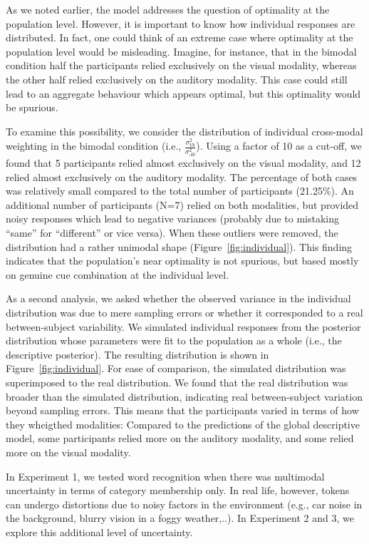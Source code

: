 \documentclass[english,man]{apa6}
\theoremstyle{definition}
\theoremstyle{definition}
\theoremstyle{definition}
\theoremstyle{remark}
\begin{document}
As we noted earlier, the model addresses the question of optimality at
the population level. However, it is important to know how individual
responses are distributed. In fact, one could think of an extreme case
where optimality at the population level would be misleading. Imagine,
for instance, that in the bimodal condition half the participants relied
exclusively on the visual modality, whereas the other half relied
exclusively on the auditory modality. This case could still lead to an
aggregate behaviour which appears optimal, but this optimality would be
spurious.

To examine this possibility, we consider the distribution of individual
cross-modal weighting in the bimodal condition (i.e.,
\(\frac{\sigma^2_{Vb}}{\sigma^2_{Ab}}\)). Using a factor of 10 as a
cut-off, we found that 5 participants relied almost exclusively on the
visual modality, and 12 relied almost exclusively on the auditory
modality. The percentage of both cases was relatively small compared to
the total number of participants (21.25\%). An additional number of
participants (N=7) relied on both modalities, but provided noisy
responses which lead to negative variances (probably due to mistaking
\enquote{same} for \enquote{different} or vice versa). When these
outliers were removed, the distribution had a rather unimodal shape
(Figure~\ref{fig:individual}). This finding indicates that the
population's near optimality is not spurious, but based mostly on
genuine cue combination at the individual level.

As a second analysis, we asked whether the observed variance in the
individual distribution was due to mere sampling errors or whether it
corresponded to a real between-subject variability. We simulated
individual responses from the posterior distribution whose parameters
were fit to the population as a whole (i.e., the descriptive posterior).
The resulting distribution is shown in Figure~\ref{fig:individual}. For
ease of comparison, the simulated distribution was superimposed to the
real distribution. We found that the real distribution was broader than
the simulated distribution, indicating real between-subject variation
beyond sampling errors. This means that the participants varied in terms
of how they wheigthed modalities: Compared to the predictions of the
global descriptive model, some participants relied more on the auditory
modality, and some relied more on the visual modality.

In Experiment 1, we tested word recognition when there was multimodal
uncertainty in terms of category membership only. In real life, however,
tokens can undergo distortions due to noisy factors in the environment
(e.g., car noise in the background, blurry vision in a foggy
weather,..). In Experiment 2 and 3, we explore this additional level of
uncertainty.
\end{document}
